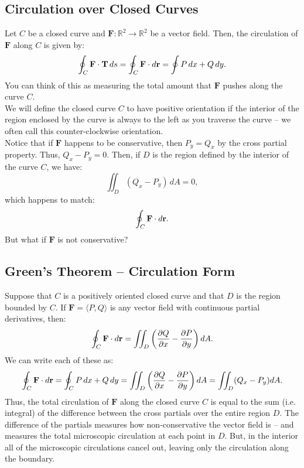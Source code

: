 \subsection{Circulation over Closed Curves}

Let \(C\) be a closed curve and \(\mathbf{F} : \mathbb{R}^2 \to \mathbb{R}^2\) be a vector field. Then, the circulation of \(\mathbf{F}\) along \(C\) is given by:
\[
    \oint_C \mathbf{F} \cdot \mathbf{T} \, ds = \oint_C \mathbf{F} \cdot d\mathbf{r} = \oint P \, dx + Q \, dy.
\]
You can think of this as measuring the total amount that \(\mathbf{F}\) pushes along the curve \(C\). \\

We will define the closed curve \(C\) to have positive orientation if the interior of the region enclosed by the curve is always to the left as you traverse the curve – we often call this counter-clockwise orientation. \\

Notice that if \(\mathbf{F}\) happens to be conservative, then \(P_y = Q_x\) by the cross partial property. Thus, \(Q_x - P_y = 0\). Then, if \(D\) is the region defined by the interior of the curve \(C\), we have:
\[
    \iint_D (Q_x - P_y) \, dA = 0,
\]
which happens to match:
\[
    \oint_C \mathbf{F} \cdot d\mathbf{r}.
\]
But what if \(\mathbf{F}\) is not conservative?

\subsection{Green's Theorem – Circulation Form}

Suppose that \(C\) is a positively oriented closed curve and that \(D\) is the region bounded by \(C\). If \(\mathbf{F} = \langle P,Q \rangle\) is any vector field with continuous partial derivatives, then:
\[
    \oint_C \mathbf{F} \cdot d\mathbf{r} = \iint_D \left( \frac{\partial Q}{\partial x} - \frac{\partial P}{\partial y} \right) dA.
\]
We can write each of these as:
\[
    \oint_C \mathbf{F} \cdot d\mathbf{r} = \oint_C P \, dx + Q \, dy = \iint_D \left( \frac{\partial Q}{\partial x} - \frac{\partial P}{\partial y} \right) dA = \iint_D (Q_x - P_y) dA.
\]
Thus, the total circulation of \(\mathbf{F}\) along the closed curve \(C\) is equal to the sum (i.e. integral) of the difference between the cross partials over the entire region \(D\). The difference of the partials measures how non-conservative the vector field is – and measures the total microscopic circulation at each point in \(D\). But, in the interior all of the microscopic circulations cancel out, leaving only the circulation along the boundary. \\


